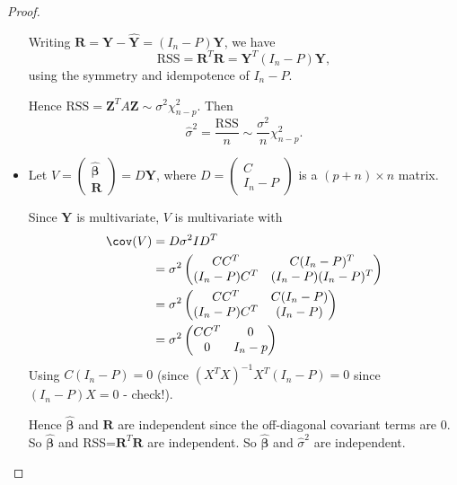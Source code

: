 \documentclass[a4paper]{article}
\begin{document}
\begin{proof}
\begin{itemize}
      Writing $\mathbf{R} = \mathbf{Y} - \hat{\mathbf{Y}} = (I_n - P)\mathbf{Y}$, we have
      \[
        \mathrm{RSS} = \mathbf{R}^T\mathbf{R} = \mathbf{Y}^T(I_n - P)\mathbf{Y},
      \]
      using the symmetry and idempotence of $I_n - P$.

      Hence $\mathrm{RSS} = \mathbf{Z}^TA\mathbf{Z} \sim \sigma^2\chi^2_{n - p}$. Then
      \[
        \hat{\sigma}^2 = \frac{\mathrm{RSS}}{n}\sim \frac{\sigma^2}{n}\chi^2_{n- p}.
      \]
    \item Let $V = \begin{pmatrix}\hat{\boldsymbol\beta}\\\mathbf{R}\end{pmatrix} = D\mathbf{Y}$, where $D = \begin{pmatrix}C\\I_n - P\end{pmatrix}$ is a $(p + n)\times n$ matrix.

      Since $\mathbf{Y}$ is multivariate, $V$ is multivariate with
      \begin{align*}
        \cov (V) &= D\sigma^2ID^T\\
        &= \sigma^2
        \begin{pmatrix}
          CC^T & C(I_n - P)^T\\
          (I_n - P)C^T & (I_n - P)(I_n - P)^T
        \end{pmatrix}\\
        &=
        \sigma^2
        \begin{pmatrix}
          CC^T & C(I_n - P)\\
          (I_n - P)C^T & (I_n - P)
        \end{pmatrix}\\
        &= \sigma^2
        \begin{pmatrix}
          CC^T & 0\\
          0 & I_n - p
        \end{pmatrix}
      \end{align*}
      Using $C(I_n - P) = 0$ (since $(X^TX)^{-1}X^T(I_n - P) = 0$ since $(I_n - P)X = 0$ - check!).

      Hence $\hat{\boldsymbol\beta}$ and $\mathbf{R}$ are independent since the off-diagonal covariant terms are 0. So $\hat{\boldsymbol\beta}$ and RSS=$\mathbf{R}^T\mathbf{R}$ are independent. So $\hat{\boldsymbol\beta}$ and $\hat{\sigma}^2$ are independent.
  \end{itemize}
\end{proof}
\end{document}
